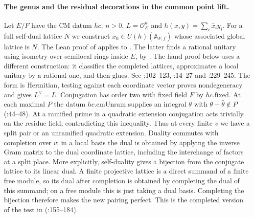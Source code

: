 \paragraph{The genus and the residual decorations in the common point lift.}
Let $E/F$ have the CM datum $hc$, $n>0$, $L=\mathcal O_E^n$ and
$h(x,y)=\sum_i\bar x_i y_i$. For a full self-dual lattice $N$
we construct $x_0\in U(h)(\mathbb A_{F,f})$ whose associated global
lattice is $N$. The Lean proof of  applies
 to .
The latter finds a rational unitary using isometry over semilocal rings
inside $E$, by .
The hand proof below uses a different construction: it classifies the
completed lattices, approximates a local unitary by a rational one, and
then glues. See :102--123,
:14--27 and
:229--245.
The form is Hermitian, testing against each coordinate vector proves
nondegeneracy and gives $L^\vee=L$. Conjugation has order two with
fixed field $F$ by $hc.\mathrm{fixed}$. At each maximal $P$ the datum
$hc.\mathrm{cmUnram}$ supplies an integral $\theta$ with
$\theta-\bar\theta\notin P$ (:44--48).
At a ramified prime in a quadratic extension conjugation acts trivially
on the residue field, contradicting this inequality. Thus at every
finite $v$ we have a split pair or an unramified quadratic extension.
Duality commutes with completion over $v$: in a local basis the
dual is obtained by applying the inverse Gram matrix to the dual
coordinate lattice, including the interchange of factors at a split
place. More explicitly, self-duality gives a bijection from the
conjugate lattice to its linear dual. A finite projective lattice is
a direct summand of a finite free module, so its dual after completion
is obtained by completing the dual of this summand; on a free module
this is just taking a dual basis. Completing the bijection therefore
makes the new pairing perfect. This is the completed version of the
test in 
(:155--184).

